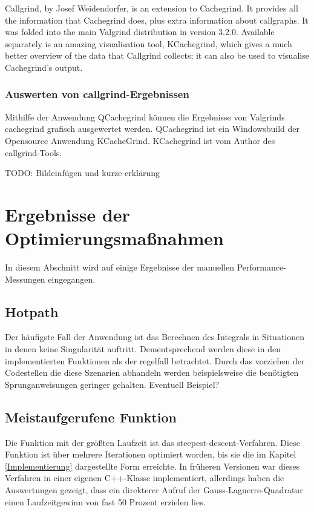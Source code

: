 Callgrind, by Josef Weidendorfer, is an extension to Cachegrind. It provides all the information that Cachegrind does, plus extra information about callgraphs. It was folded into the main Valgrind distribution in version 3.2.0. Available separately is an amazing visualisation tool, KCachegrind, which gives a much better overview of the data that Callgrind collects; it can also be used to visualise Cachegrind's output.


\subsubsection{Auswerten von callgrind-Ergebnissen}

Mithilfe der Anwendung QCachegrind können die Ergebnisse von Valgrinds cachegrind grafisch ausgewertet werden. QCachegrind ist ein Windowsbuild der Opensource Anwendung KCacheGrind.
KCachegrind ist vom Author des callgrind-Tools\cite{kcachegrind}.

TODO: Bildeinfügen und kurze erklärung


\section{Ergebnisse der Optimierungsmaßnahmen}

In diesem Abschnitt wird auf einige Ergebnisse der manuellen Performance-Messungen eingegangen.

\subsection{Hotpath}

Der häufigste Fall der Anwendung ist das Berechnen des Integrals in Situationen in denen keine Singularität auftritt. 
Dementsprechend werden diese in den implementierten Funktionen als der regelfall betrachtet.
Durch das vorziehen der Codestellen die diese Szenarien abhandeln werden beispielsweise die benötigten Sprunganweisungen geringer gehalten.
Eventuell Beispiel?



\subsection{Meistaufgerufene Funktion}
Die Funktion mit der größten Laufzeit ist das steepest-descent-Verfahren.
Diese Funktion ist über mehrere Iterationen optimiert worden, bis sie die im Kapitel \ref{Implementierung} dargestellte Form erreichte.
In früheren Versionen war dieses Verfahren in einer eigenen C++-Klasse implementiert, allerdings haben die Auswertungen gezeigt, dass ein
direkterer Aufruf der Gauss-Laguerre-Quadratur einen Laufzeitgewinn von fast 50 Prozent erzielen lies.

